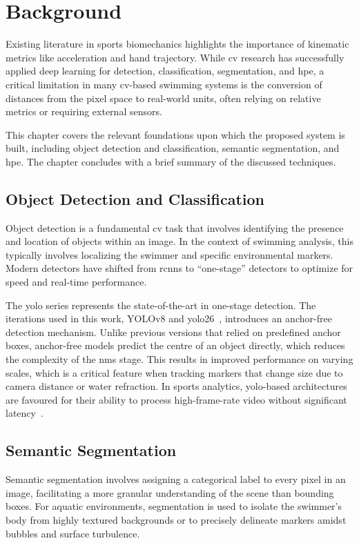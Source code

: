 \graphicspath{{content/chapters/2_background/figures/}}

\chapter{Background}%
\label{chp:background}
Existing literature in sports biomechanics highlights the importance of kinematic metrics like acceleration and hand trajectory. While \gls{cv} research has successfully applied deep learning for detection, classification, segmentation, and \gls{hpe}, a critical limitation in many \gls{cv}-based swimming systems is the conversion of distances from the pixel space to real-world units, often relying on relative metrics or requiring external sensors.

This chapter covers the relevant foundations upon which the proposed system is built, including object detection and classification, semantic segmentation, and \gls{hpe}. The chapter concludes with a brief summary of the discussed techniques.

\section{Object Detection and Classification}
Object detection is a fundamental \gls{cv} task that involves identifying the presence and location of objects within an image. In the context of swimming analysis, this typically involves localizing the swimmer and specific environmental markers. Modern detectors have shifted from \gls{rcnn}s to ``one-stage'' detectors to optimize for speed and real-time performance.

The \gls{yolo} series represents the state-of-the-art in one-stage detection. The iterations used in this work, YOLOv8 and \gls{yolo26}~\cite{jocher_ultralytics_2023}, introduces an anchor-free detection mechanism. Unlike previous versions that relied on predefined anchor boxes, anchor-free models predict the centre of an object directly, which reduces the complexity of the \gls{nms} stage. This results in improved performance on varying scales, which is a critical feature when tracking markers that change size due to camera distance or water refraction. In sports analytics, \gls{yolo}-based architectures are favoured for their ability to process high-frame-rate video without significant latency~\cite{wang2023yolov7}.


\section{Semantic Segmentation}
Semantic segmentation involves assigning a categorical label to every pixel in an image, facilitating a more granular understanding of the scene than bounding boxes. For aquatic environments, segmentation is used to isolate the swimmer's body from highly textured backgrounds or to precisely delineate markers amidst bubbles and surface turbulence.

